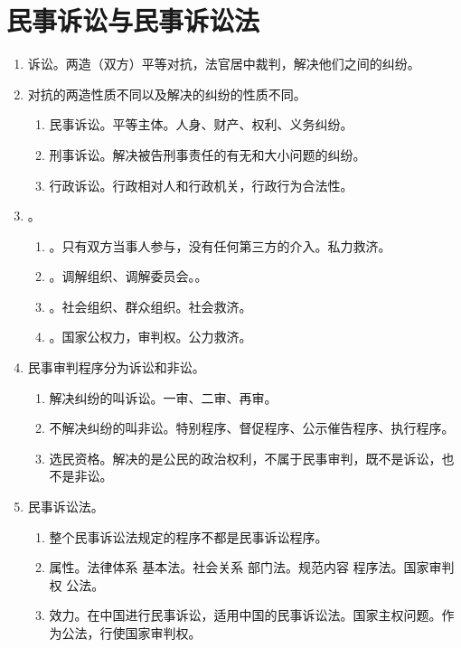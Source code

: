 \section{民事诉讼与民事诉讼法}
\begin{enumerate}
  \item 诉讼。两造（双方）平等对抗，法官居中裁判，解决他们之间的纠纷。
  \item 对抗的两造性质不同以及解决的纠纷的性质不同。
        \begin{enumerate}
          \item 民事诉讼。平等主体。人身、财产、权利、义务纠纷。
          \item 刑事诉讼。解决被告刑事责任的有无和大小问题的纠纷。
          \item 行政诉讼。行政相对人和行政机关，行政行为合法性。
        \end{enumerate}
  \item {}。
        \begin{enumerate}
          \item {}。只有双方当事人参与，没有任何第三方的介入。私力救济。
          \item {}。调解组织、调解委员会。。
          \item {}。社会组织、群众组织。社会救济。
          \item {}。国家公权力，审判权。公力救济。
        \end{enumerate}
  \item 民事审判程序分为诉讼和非讼。
        \begin{enumerate}
          \item 解决纠纷的叫诉讼。一审、二审、再审。
          \item 不解决纠纷的叫非讼。特别程序、督促程序、公示催告程序、执行程序。
          \item 选民资格。解决的是公民的政治权利，不属于民事审判，既不是诉讼，也不是非讼。
        \end{enumerate}
  \item 民事诉讼法。
        \begin{enumerate}
          \item 整个民事诉讼法规定的程序不都是民事诉讼程序。
          \item 属性。法律体系 \yjt 基本法。社会关系 \yjt 部门法。规范内容 \yjt 程序法。国家审判权 \yjt 公法。
          \item 效力。在中国进行民事诉讼，适用中国的民事诉讼法。国家主权问题。作为公法，行使国家审判权。
        \end{enumerate}
\end{enumerate}
